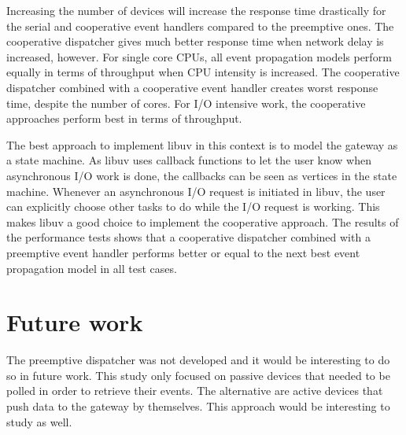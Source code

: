 Increasing the number of devices will increase the response time drastically
for the serial and cooperative event handlers compared to the preemptive ones.
The cooperative dispatcher gives much better response time when network delay
is increased, however. For single core CPUs, all event propagation models
perform equally in terms of throughput when CPU intensity is increased. The
cooperative dispatcher combined with a cooperative event handler creates worst
response time, despite the number of cores. For I/O intensive work, the
cooperative approaches perform best in terms of throughput.

The best approach to implement libuv in this context is to model the gateway as
a state machine. As libuv uses callback functions to let the user know when
asynchronous I/O work is done, the callbacks can be seen as vertices in the
state machine. Whenever an asynchronous I/O request is initiated in libuv, the
user can explicitly choose other tasks to do while the I/O request is working.
This makes libuv a good choice to implement the cooperative approach. The
results of the performance tests shows that a cooperative dispatcher combined
with a preemptive event handler performs better or equal to the next best event
propagation model in all test cases.

\section{Future work}

The preemptive dispatcher was not developed and it would be interesting to do
so in future work. This study only focused on passive devices that needed to be
polled in order to retrieve their events. The alternative are active devices
that push data to the gateway by themselves. This approach would be interesting
to study as well.
